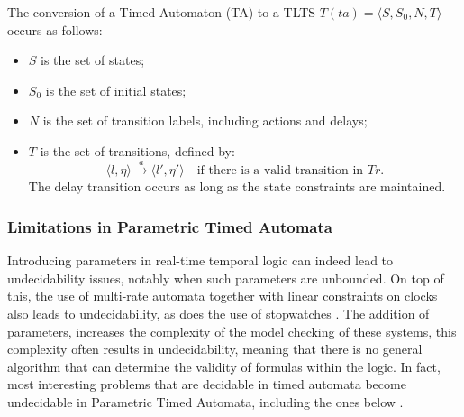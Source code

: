 The conversion of a Timed Automaton (TA) to a TLTS \( T(ta) = \langle S, S_0, N, T \rangle \) occurs as follows:

\begin{itemize}
    \item \( S \) is the set of states;
    \item \( S_0 \) is the set of initial states;
    \item \( N \) is the set of transition labels, including actions and delays;
    \item \( T \) is the set of transitions, defined by:
    \[
        \langle l, \eta \rangle \xrightarrow{a} \langle l', \eta' \rangle \quad \text{if there is a valid transition in } Tr.
    \]
    The delay transition occurs as long as the state constraints are maintained.
\end{itemize}




\subsubsection{Limitations in Parametric Timed Automata}

Introducing parameters in real-time temporal logic can indeed lead to undecidability issues, notably when such parameters are unbounded. On top of this, the use of multi-rate automata together with linear constraints on clocks also leads to undecidability, as does the use of stopwatches \cite{Andre2021}. The addition of parameters, increases the complexity of the model checking of these systems, this complexity often results in undecidability, meaning that there is no general algorithm that can determine the validity of formulas within the logic. In fact, most interesting problems that are decidable in timed automata become undecidable in Parametric Timed Automata, including the ones below \cite{Andre2021}.


